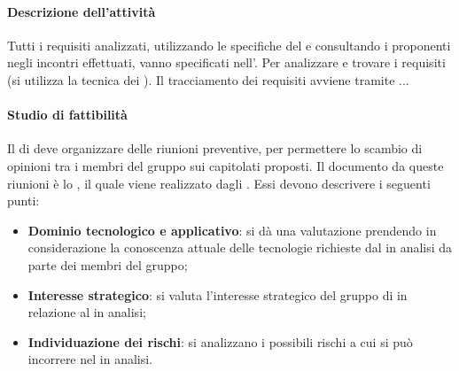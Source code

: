  \paragraph{Descrizione dell'attività}
 Tutti i requisiti analizzati, utilizzando le specifiche del  e consultando i proponenti negli
incontri effettuati, vanno specificati nell'\ARdocRR. Per analizzare e trovare i
requisiti (si utilizza la tecnica dei ). Il tracciamento dei requisiti avviene tramite ... 
 \paragraph{Studio di fattibilità}
 Il \RESP{} di  deve organizzare delle riunioni preventive, per permettere lo scambio
di opinioni tra i membri del gruppo sui capitolati proposti. Il documento  da queste
riunioni è lo \SFdocRR , il quale viene realizzato dagli \ANP{}. Essi devono
descrivere i seguenti punti: 
\begin{itemize}
 \item \textbf{Dominio tecnologico e applicativo}: si dà una valutazione prendendo in   considerazione
 la conoscenza attuale delle tecnologie richieste dal  in analisi da parte dei membri  
del gruppo;
 \item \textbf{Interesse strategico}: si valuta l'interesse strategico del gruppo di  in relazione
al  in analisi;
 \item \textbf{Individuazione dei rischi}: si analizzano i possibili rischi a cui si può incorrere nel
 in analisi.
\end{itemize}
